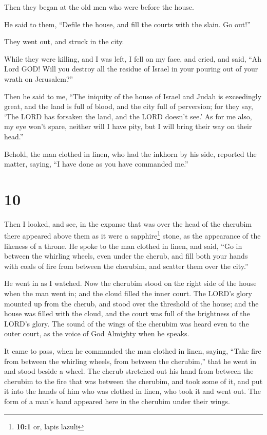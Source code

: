 Then they began at the old men who were before the house.

 He said to them, ``Defile the house, and fill the courts
with the slain. Go out!''

They went out, and struck in the city.

 While they were killing, and I was left, I fell on my
face, and cried, and said, ``Ah Lord GOD! Will you destroy all the
residue of Israel in your pouring out of your wrath on Jerusalem?''

 Then he said to me, ``The iniquity of the house of Israel
and Judah is exceedingly great, and the land is full of blood, and the
city full of perversion; for they say, `The LORD has forsaken the land,
and the LORD doesn't see.'  As for me also, my eye won't
spare, neither will I have pity, but I will bring their way on their
head.''

 Behold, the man clothed in linen, who had the inkhorn by
his side, reported the matter, saying, ``I have done as you have
commanded me.''

\hypertarget{section-8}{%
\section{10}\label{section-8}}

 Then I looked, and see, in the expanse that was over the
head of the cherubim there appeared above them as it were a
sapphire\footnote{\textbf{10:1} or, lapis lazuli} stone, as the
appearance of the likeness of a throne.  He spoke to the
man clothed in linen, and said, ``Go in between the whirling wheels,
even under the cherub, and fill both your hands with coals of fire from
between the cherubim, and scatter them over the city.''

He went in as I watched.  Now the cherubim stood on the
right side of the house when the man went in; and the cloud filled the
inner court.  The LORD's glory mounted up from the cherub,
and stood over the threshold of the house; and the house was filled with
the cloud, and the court was full of the brightness of the LORD's glory.
 The sound of the wings of the cherubim was heard even to
the outer court, as the voice of God Almighty when he speaks.

 It came to pass, when he commanded the man clothed in
linen, saying, ``Take fire from between the whirling wheels, from
between the cherubim,'' that he went in and stood beside a wheel.
 The cherub stretched out his hand from between the
cherubim to the fire that was between the cherubim, and took some of it,
and put it into the hands of him who was clothed in linen, who took it
and went out.  The form of a man's hand appeared here in
the cherubim under their wings.


